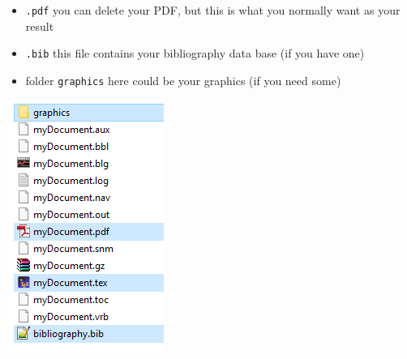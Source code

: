 {\begin{frame}
\begin{minipage}{.58\textwidth}
\begin{itemize}
		\item \texttt{.pdf} \ras you can delete your PDF, but this is what you normally want as your result
		
		\item \texttt{.bib} \ras this file contains your bibliography data base (if you have one)
		
		\item folder \texttt{graphics} \ras here could be your graphics (if you need some)
	\end{itemize}
	
\end{minipage}
%
\begin{minipage}{.40\textwidth}
	\centering
	\includegraphics[width=.9\linewidth]{../../texfiles-beamer/tex-material/WissArb-latex/latexDateien}
	
\end{minipage}

\end{frame}

}
{


}%


